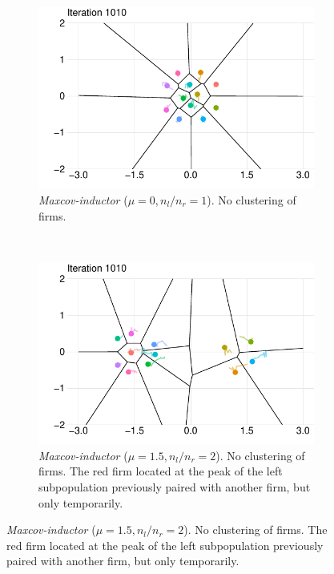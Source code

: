 \documentclass[preprint, 12pt]{elsarticle}
\begin{document}
\begin{figure}[hb!]
	\begin{subfigure}[t]{0.485\textwidth}
		\includegraphics[width=\textwidth]{Graphics/figm_cmiu.pdf}
		\caption{\emph{Maxcov-inductor} ($\mu=0, n_l/n_r = 1$). No clustering of firms.}
		\label{fig:twelve_uni_mi}
	\end{subfigure}
	~
	\begin{subfigure}[t]{0.485\textwidth}
		\includegraphics[width=\textwidth]{Graphics/figm_cmib.pdf}
		\caption{\emph{Maxcov-inductor} ($\mu=1.5, n_l/n_r = 2$). No clustering of firms. The red firm located at the peak of the left subpopulation previously paired with another firm, but only temporarily.}
		\label{fig:twelve_bi_mi}
	\end{subfigure}
	
	\label{fig:twelve}
\end{figure}
\end{document}
